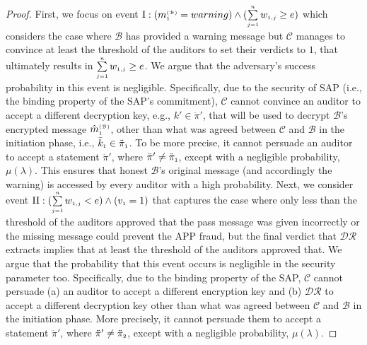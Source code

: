 \vspace{-3mm}
\begin{proof}
 First, we focus on event $\text{\MakeUppercase{\romannumeral 1}}:  (m^{\st\mathcal{(B)}}_{\st1}=warning) \wedge (\sum\limits_{\st j=1}^{\st n}w_{\st 1,j}\geq {e})$ which considers the case where $\mathcal{B}$ has provided a warning message but $\mathcal{C}$ manages to  convince at least the threshold of the auditors to set their verdicts to $1$,  that ultimately results in $\sum\limits_{\scriptscriptstyle j=1}^{\scriptscriptstyle n}w_{\scriptscriptstyle 1,j}\geq e$. We argue that the adversary's success probability in this event is negligible. Specifically, due to the security of SAP (i.e., the binding property of the SAP's commitment), $\mathcal{C}$ cannot convince an auditor to accept a different decryption key, e.g., $k'\in \ddot\pi'$, that will be used to decrypt $\mathcal{B}$'s encrypted message $\hat {m}^{\scriptscriptstyle(\mathcal {B})}_{\scriptscriptstyle 1}$, other than what was agreed between $\mathcal{C}$ and $\mathcal{B}$ in the initiation phase, i.e., $\bar k_{\scriptscriptstyle 1}\in \ddot \pi_{\scriptscriptstyle 1}$.  To be more precise, it cannot persuade an auditor to accept a statement $\ddot \pi'$, where $\ddot \pi'\neq \ddot \pi_{\scriptscriptstyle 1}$, except with a negligible probability, $\mu(\lambda)$. This ensures that  honest $\mathcal{B}$’s original message (and accordingly the warning) is accessed by every auditor with a high probability. Next, we consider event  $\text{\MakeUppercase{\romannumeral 2}}:  (\sum\limits_{\st j=1}^{\st n}w_{\st 1,j}<{e}) \wedge ( {v}_{\st 1}=1)$ that captures the case where only less than the  threshold of the auditors approved that the pass message was given incorrectly or the missing message could  prevent the APP fraud, but the final verdict that $\mathcal{DR}$ extracts implies that at least the threshold of the auditors approved that. We argue that the probability that this event occurs is negligible in the security parameter too. Specifically, due to the binding property of the SAP,  $\mathcal{C}$ cannot persuade (a)  an auditor to accept a different encryption key and (b) $\mathcal{DR}$ to accept a different decryption key other than what was agreed between $\mathcal{C}$ and $\mathcal{B}$ in the initiation phase. More precisely, it cannot persuade them to accept a statement $\ddot \pi'$, where $\ddot \pi'\neq \ddot \pi_{\scriptscriptstyle 2}$, except with a negligible probability, $\mu(\lambda)$. %
 

\end{proof}
